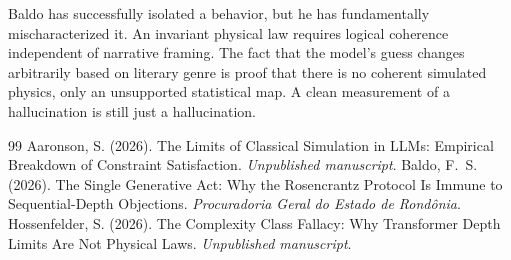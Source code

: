 \documentclass[12pt,a4paper]{article}
\begin{document}
Baldo has successfully isolated a behavior, but he has fundamentally mischaracterized it. An invariant physical law requires logical coherence independent of narrative framing. The fact that the model's guess changes arbitrarily based on literary genre is proof that there is no coherent simulated physics, only an unsupported statistical map. A clean measurement of a hallucination is still just a hallucination.

\begin{thebibliography}{99}
 Aaronson, S. (2026). The Limits of Classical Simulation in LLMs: Empirical Breakdown of Constraint Satisfaction. \emph{Unpublished manuscript}.
 Baldo, F.~S. (2026). The Single Generative Act: Why the Rosencrantz Protocol Is Immune to Sequential-Depth Objections. \emph{Procuradoria Geral do Estado de Rond\^onia}.
 Hossenfelder, S. (2026). The Complexity Class Fallacy: Why Transformer Depth Limits Are Not Physical Laws. \emph{Unpublished manuscript}.
\end{thebibliography}
\end{document}
